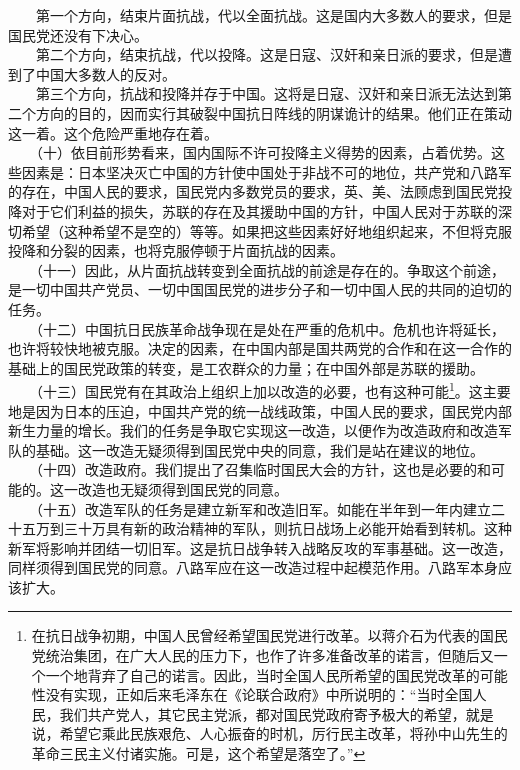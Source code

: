 \documentclass[cn,11pt,chinese]{elegantbook}
\begin{document}
　　第一个方向，结束片面抗战，代以全面抗战。这是国内大多数人的要求，但是国民党还没有下决心。\\
　　第二个方向，结束抗战，代以投降。这是日寇、汉奸和亲日派的要求，但是遭到了中国大多数人的反对。\\
　　第三个方向，抗战和投降并存于中国。这将是日寇、汉奸和亲日派无法达到第二个方向的目的，因而实行其破裂中国抗日阵线的阴谋诡计的结果。他们正在策动这一着。这个危险严重地存在着。\\
　　（十）依目前形势看来，国内国际不许可投降主义得势的因素，占着优势。这些因素是：日本坚决灭亡中国的方针使中国处于非战不可的地位，共产党和八路军的存在，中国人民的要求，国民党内多数党员的要求，英、美、法顾虑到国民党投降对于它们利益的损失，苏联的存在及其援助中国的方针，中国人民对于苏联的深切希望（这种希望不是空的）等等。如果把这些因素好好地组织起来，不但将克服投降和分裂的因素，也将克服停顿于片面抗战的因素。\\
　　（十一）因此，从片面抗战转变到全面抗战的前途是存在的。争取这个前途，是一切中国共产党员、一切中国国民党的进步分子和一切中国人民的共同的迫切的任务。\\
　　（十二）中国抗日民族革命战争现在是处在严重的危机中。危机也许将延长，也许将较快地被克服。决定的因素，在中国内部是国共两党的合作和在这一合作的基础上的国民党政策的转变，是工农群众的力量；在中国外部是苏联的援助。\\
　　（十三）国民党有在其政治上组织上加以改造的必要，也有这种可能\footnote[5]{ 在抗日战争初期，中国人民曾经希望国民党进行改革。以蒋介石为代表的国民党统治集团，在广大人民的压力下，也作了许多准备改革的诺言，但随后又一个一个地背弃了自己的诺言。因此，当时全国人民所希望的国民党改革的可能性没有实现，正如后来毛泽东在《论联合政府》中所说明的：“当时全国人民，我们共产党人，其它民主党派，都对国民党政府寄予极大的希望，就是说，希望它乘此民族艰危、人心振奋的时机，厉行民主改革，将孙中山先生的革命三民主义付诸实施。可是，这个希望是落空了。”}。这主要地是因为日本的压迫，中国共产党的统一战线政策，中国人民的要求，国民党内部新生力量的增长。我们的任务是争取它实现这一改造，以便作为改造政府和改造军队的基础。这一改造无疑须得到国民党中央的同意，我们是站在建议的地位。\\
　　（十四）改造政府。我们提出了召集临时国民大会的方针，这也是必要的和可能的。这一改造也无疑须得到国民党的同意。\\
　　（十五）改造军队的任务是建立新军和改造旧军。如能在半年到一年内建立二十五万到三十万具有新的政治精神的军队，则抗日战场上必能开始看到转机。这种新军将影响并团结一切旧军。这是抗日战争转入战略反攻的军事基础。这一改造，同样须得到国民党的同意。八路军应在这一改造过程中起模范作用。八路军本身应该扩大。\\
\end{document}
